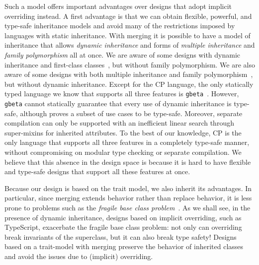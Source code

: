 Such a model offers important advantages over designs that adopt implicit
overriding instead. A first advantage is that we can obtain flexible, powerful,
and type-safe inheritance models and avoid many of the restrictions imposed by
languages with static inheritance.  With merging it is possible to have a model
of inheritance that allows \emph{dynamic inheritance} and forms of
\emph{multiple inheritance} and \emph{family polymorphism} all at once. We are
aware of some designs with dynamic inheritance and first-class
classes~\citep{takikawa2012gradual,lee2015theory}, but without family
polymorphism.  We are also aware of some designs with both multiple inheritance
and family polymorphism~\citep{nystrom2006j,aracic2006overview,clarke2007tribe},
but without dynamic inheritance. Except for the CP language, the only statically
typed language we know that supports all three features is
\texttt{gbeta}~\citep{ernst2000gbeta}. However, \texttt{gbeta} cannot statically
guarantee that every use of dynamic inheritance is type-safe, although
\citet{ernst2002safe} proves a subset of use cases to be type-safe. Moreover,
separate compilation can only be supported with an inefficient linear search
through super-mixins for inherited attributes. To the best of our knowledge, CP
is the only language that supports all three features in a completely type-safe
manner, without compromising on modular type checking or separate compilation.
We believe that this absence in the design space is because it is hard to have
flexible and type-safe designs that support all these features at once.

Because our design is based on the trait model, we also inherit its advantages.
In particular, since merging extends behavior rather than replace behavior, it
is less prone to problems such as the \emph{fragile base class
problem}~\citep{mikhajlov1998study}. As we shall see, in the presence of dynamic
inheritance, designs based on implicit overriding, such as TypeScript,
exacerbate the fragile base class problem: not only can overriding break
invariants of the superclass, but it can also break type safety! Designs based
on a trait-model with merging preserve the behavior of inherited classes and
avoid the issues due to (implicit) overriding.
